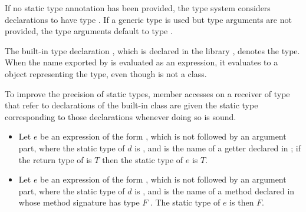 \documentclass[makeidx]{article}
\begin{document}
{\LMHash{}%
If no static type annotation has been provided,
the type system considers declarations to have type \DYNAMIC.
If a generic type is used but type arguments are not provided,
the type arguments default to type \DYNAMIC.


\LMHash{}%
The built-in type declaration ,
which is declared in the library ,
denotes the \DYNAMIC{} type.
When the name \DYNAMIC{} exported by  is evaluated
as an expression,
it evaluates to a  object representing the \DYNAMIC{} type,
even though \DYNAMIC{} is not a class.


\LMHash{}%
To improve the precision of static types,
member accesses on a receiver of type \DYNAMIC{} that refer to
declarations of the built-in class 
are given the static type corresponding to those declarations
whenever doing so is sound.

\begin{itemize}
\item
  Let $e$ be an expression of the form ,
  which is not followed by an argument part,
  where the static type of $d$ is \DYNAMIC,
  and \id{} is the name of a getter declared in ;
  if the return type of  is $T$ then
  the static type of $e$ is $T$.

\item
  Let $e$ be an expression of the form ,
  which is not followed by an argument part,
  where the static type of $d$ is \DYNAMIC,
  and \id{} is the name of a method declared in 
  whose method signature has type $F$
  .
  The static type of $e$ is then $F$.


\end{itemize}}
\end{document}
